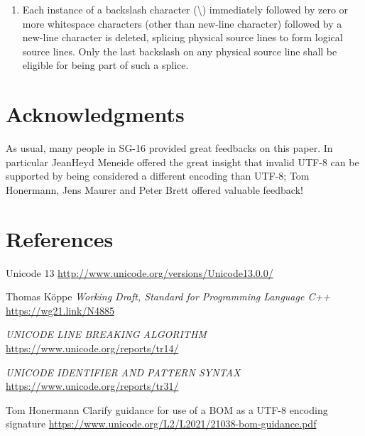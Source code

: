 \documentclass{wg21}
\begin{document}
\begin{enumerate}
\item
{}%
%
Each instance of a backslash character (\textbackslash)
immediately followed by zero or more whitespace characters (other than new-line character) followed by a new-line character is deleted, splicing
physical source lines to form logical source lines. Only the last
backslash on any physical source line shall be eligible for being part
of such a splice.

\end{enumerate}

\section{Acknowledgments}

As usual, many people in SG-16 provided great feedbacks on this paper.
In particular JeanHeyd Meneide offered the great insight that invalid UTF-8 can be supported by being considered a different encoding than UTF-8; Tom Honermann, Jens Maurer and Peter Brett offered valuable feedback!


\section{References}
\renewcommand{\section}[2]{}%



\begin{thebibliography}{9}


Unicode 13\newline
\url{http://www.unicode.org/versions/Unicode13.0.0/}

Thomas Köppe
\emph{Working Draft, Standard for Programming Language C++}\newline
\url{https://wg21.link/N4885}

\emph{UNICODE LINE BREAKING ALGORITHM}\newline
\url{https://www.unicode.org/reports/tr14/}

\emph{UNICODE IDENTIFIER AND PATTERN SYNTAX}\newline
\url{https://www.unicode.org/reports/tr31/}

Tom Honermann
Clarify guidance for use of a BOM as a UTF-8 encoding signature
\url{https://www.unicode.org/L2/L2021/21038-bom-guidance.pdf}
    

\end{thebibliography}
\end{document}

